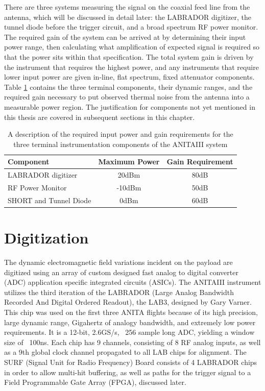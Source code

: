 		There are three systems measuring the signal on the coaxial feed line from the antenna, which will be discussed in detail later: the LABRADOR digitizer, the tunnel diode before the trigger circuit, and a broad spectrum RF power monitor.  The required gain of the system can be arrived at by determining their input power range, then calculating what amplification of expected signal is required so that the power sits within that specification.  The total system gain is driven by the instrument that requires the highest power, and any instruments that require lower input power are given in-line, flat spectrum, fixed attenuator components.  Table \ref{tab:rfLinkBudget} contains the three terminal components, their dynamic ranges, and the required gain necessary to put observed thermal noise from the antenna into a measurable power region.  The justification for components not yet mentioned in this thesis are covered in subsequent sections in this chapter.
	
\begin{table}
	\centering
	\begin{tabular}{| l | c | c |}
		\hline
		Component & Maximum Power & Gain Requirement\\
		\hline
		LABRADOR digitizer & 20dBm & 80dB \\
		RF Power Monitor & -10dBm & 50dB \\
		SHORT and Tunnel Diode & 0dBm & 60dB \\
		\hline
	\end{tabular}
	\caption{A description of the required input power and gain requirements for the three terminal instrumentation components of the ANITAIII system}
	\label{tab:rfLinkBudget}
\end{table}
	


	
\section{Digitization}
	The dynamic electromagnetic field variations incident on the payload are digitized using an array of custom designed fast analog to digital converter (ADC) application specific integrated circuits (ASICs).  The ANITAIII instrument utilizes the third iteration of the LABRADOR (Large Analog Bandwidth Recorded And Digital Ordered Readout), the LAB3, designed by Gary Varner\cite{LABASICPAPER}.  This chip was used on the first three ANITA flights because of its high precision, large dynamic range, Gigahertz of analogy bandwidth, and extremely low power requirements.   It is a 12-bit, 2.6GS/s, ~256 sample long ADC, yielding a window size of ~100ns.  Each chip has 9 channels, consisting of 8 RF analog inputs, as well as a 9th global clock channel propagated to all LAB chips for alignment.  The SURF (Signal Unit for Radio Frequency) Board consists of 4 LABRADOR chips in order to allow multi-hit buffering, as well as paths for the trigger signal to a Field Programmable Gate Array (FPGA), discussed later.

